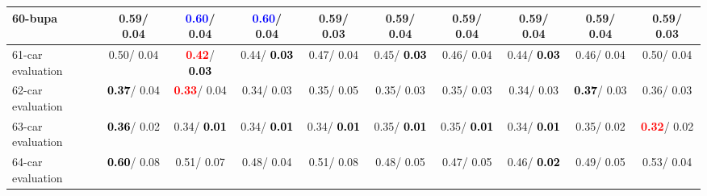\begin{table}[h]
\begin{center}
{\begin{tabular}{lc|c|c|c|c|c|c|c|c}
60-bupa &   0.59/  0.04 & \textcolor{blue}{\textbf{  0.60}}/  0.04 & \textcolor{blue}{\textbf{  0.60}}/  0.04 &   0.59/  0.03 &   0.59/  0.04 &   0.59/  0.04 &   0.59/  0.04 &   0.59/  0.04 &   0.59/  0.03 \\ \hline
61-car evaluation &   0.50/  0.04 & \textcolor{red}{\textbf{  0.42}}/\textcolor{black}{\textbf{  0.03}} &   0.44/\textcolor{black}{\textbf{  0.03}} &   0.47/  0.04 &   0.45/\textcolor{black}{\textbf{  0.03}} &   0.46/  0.04 &   0.44/\textcolor{black}{\textbf{  0.03}} &   0.46/  0.04 &   0.50/  0.04 \\
62-car evaluation & \textcolor{black}{\textbf{  0.37}}/  0.04 & \textcolor{red}{\textbf{  0.33}}/  0.04 &   0.34/  0.03 &   0.35/  0.05 &   0.35/  0.03 &   0.35/  0.03 &   0.34/  0.03 & \textcolor{black}{\textbf{  0.37}}/  0.03 &   0.36/  0.03 \\
63-car evaluation & \textcolor{black}{\textbf{  0.36}}/  0.02 &   0.34/\textcolor{black}{\textbf{  0.01}} &   0.34/\textcolor{black}{\textbf{  0.01}} &   0.34/\textcolor{black}{\textbf{  0.01}} &   0.35/\textcolor{black}{\textbf{  0.01}} &   0.35/\textcolor{black}{\textbf{  0.01}} &   0.34/\textcolor{black}{\textbf{  0.01}} &   0.35/  0.02 & \textcolor{red}{\textbf{  0.32}}/  0.02 \\
64-car evaluation & \textcolor{black}{\textbf{  0.60}}/  0.08 &   0.51/  0.07 &   0.48/  0.04 &   0.51/  0.08 &   0.48/  0.05 &   0.47/  0.05 &   0.46/\textcolor{black}{\textbf{  0.02}} &   0.49/  0.05 &   0.53/  0.04 \\\end{tabular}}\label{stratsALCKappa1Allallb}
\end{center}
\end{table}
